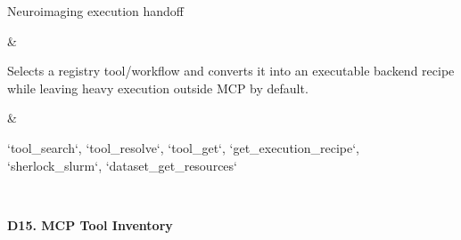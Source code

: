 {\begin{longtable}
\begin{minipage}[t]{\linewidth}
Neuroimaging execution handoff
\end{minipage} & \begin{minipage}[t]{\linewidth}\RaggedRight\hspace{0pt}
Selects a registry tool/\allowbreak{}workflow and converts it into an executable backend recipe while leaving heavy execution outside MCP by default.
\end{minipage} & \begin{minipage}[t]{\linewidth}\RaggedRight\hspace{0pt}
`tool\_\allowbreak{}search`, `tool\_\allowbreak{}resolve`, `tool\_\allowbreak{}get`, `get\_\allowbreak{}execution\_\allowbreak{}recipe`, `sherlock\_\allowbreak{}slurm`, `dataset\_\allowbreak{}get\_\allowbreak{}resources`
\end{minipage} \\
\end{longtable}
}

\textbf{D15. MCP Tool Inventory}

